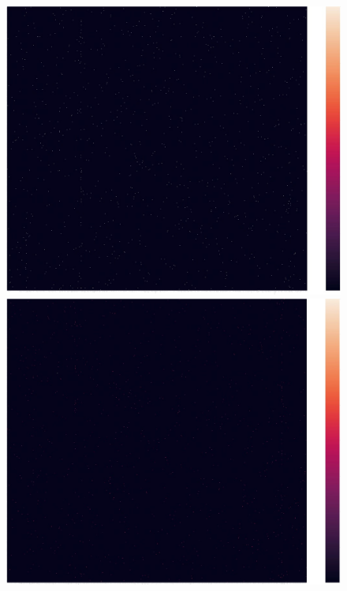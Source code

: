 \documentclass[12pt,%
               a4paper,%
               oneside,openany,%
               titlepage,%
               headinclude,footinclude,%
               BCOR5mm,%
               cleardoublepage=empty,%
               tablecaptionabove,%
               floatperchapter,
               ]{scrreprt}                 %
\begin{document}
\begin{figure}[ht]
\begin{minipage}[b]{0.5\linewidth}
    \vspace{4ex}
  \end{minipage}
  \begin{minipage}[b]{0.5\linewidth}
    \centering
    \includegraphics[width=.9\linewidth]{Figures/Matrix_delta.jpg}
    \vspace{4ex}
  \end{minipage}
    \begin{minipage}[b]{0.5\linewidth}
    \centering
    \includegraphics[width=.9\linewidth]{Figures/Matrix_pfizer.jpg}
    \vspace{4ex}
  \end{minipage}

\end{figure}
\end{document}
